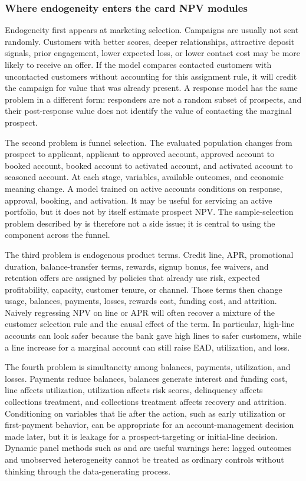 \documentclass[11pt]{article}
\newcommand{\1}{\mathbf{1}}
\begin{document}
\subsubsection{Where endogeneity enters the card NPV modules}

Endogeneity first appears at marketing selection. Campaigns are usually not
sent randomly. Customers with better scores, deeper relationships, attractive
deposit signals, prior engagement, lower expected loss, or lower contact cost
may be more likely to receive an offer. If the model compares contacted
customers with uncontacted customers without accounting for this assignment
rule, it will credit the campaign for value that was already present. A
response model has the same problem in a different form: responders are not a
random subset of prospects, and their post-response value does not identify the
value of contacting the marginal prospect.

The second problem is funnel selection. The evaluated population changes from
prospect to applicant, applicant to approved account, approved account to
booked account, booked account to activated account, and activated account to
seasoned account. At each stage, variables, available outcomes, and economic
meaning change. A model trained on active accounts conditions on response,
approval, booking, and activation. It may be useful for servicing an active
portfolio, but it does not by itself estimate prospect NPV. The sample-selection
problem described by \citet{heckman1979selection} is therefore not a side
issue; it is central to using the component across the funnel.

The third problem is endogenous product terms. Credit line, APR, promotional
duration, balance-transfer terms, rewards, signup bonus, fee waivers, and
retention offers are assigned by policies that already use risk, expected
profitability, capacity, customer tenure, or channel. Those terms then change
usage, balances, payments, losses, rewards cost, funding cost, and attrition.
Naively regressing NPV on line or APR will often recover a mixture of the
customer selection rule and the causal effect of the term. In particular,
high-line accounts can look safer because the bank gave high lines to safer
customers, while a line increase for a marginal account can still raise EAD,
utilization, and loss.

The fourth problem is simultaneity among balances, payments, utilization, and
losses. Payments reduce balances, balances generate interest and funding cost,
line affects utilization, utilization affects risk scores, delinquency affects
collections treatment, and collections treatment affects recovery and attrition.
Conditioning on variables that lie after the action, such as early utilization
or first-payment behavior, can be appropriate for an account-management
decision made later, but it is leakage for a prospect-targeting or initial-line
decision. Dynamic panel methods such as \citet{arellano1991panel} and
\citet{blundell1998initial} are useful warnings here: lagged outcomes and
unobserved heterogeneity cannot be treated as ordinary controls without
thinking through the data-generating process.
\end{document}
